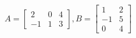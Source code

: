 \documentclass[preview]{standalone}
\begin{document}
\begin{align*}
A = \begin{bmatrix} 2 & 0 & 4 \\ -1 & 1 & 3 \end{bmatrix}, B = \begin{bmatrix} 1 & 2 \\ -1 & 5 \\ 0 & 4 \end{bmatrix}
\end{align*}
\end{document}
